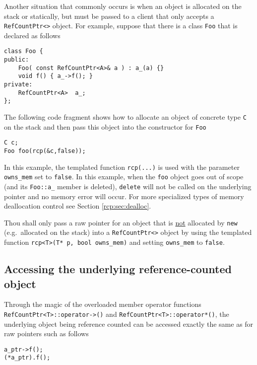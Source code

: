 Another situation that commonly occurs is when an object is allocated
on the stack or statically, but must be passed to a client that only
accepts a {}\texttt{RefCountPtr<>} object.  For example, suppose that
there is a class {}\texttt{Foo} that is declared as follows

{\scriptsize\begin{verbatim}
class Foo {
public:
    Foo( const RefCountPtr<A>& a ) : a_(a) {}
    void f() { a_->f(); }
private:
    RefCountPtr<A>  a_;
};
\end{verbatim}}

The following code fragment shows how to allocate an object of concrete
type {}\texttt{C} on the stack and then pass this object into the constructor
for {}\texttt{Foo}

{\scriptsize\begin{verbatim}
C c;
Foo foo(rcp(&c,false));
\end{verbatim}}

In this example, the templated function {}\texttt{rcp(...)} is used
with the parameter {}\texttt{owns\_mem} set to {}\texttt{false}.  In
this example, when the {}\texttt{foo} object goes out of scope (and
its {}\texttt{Foo::a\_} member is deleted), {}\texttt{delete} will not
be called on the underlying pointer and no memory error will occur.
For more specialized types of memory deallocation control see Section
{}\ref{rcp:sec:dealloc}.

\begin{commandment}
Thou shall only pass a raw pointer for an object that is
\underline{not} allocated by {}\texttt{new} (e.g.~allocated on the stack) into a
{}\texttt{RefCountPtr<>} object by using the templated function
{}\texttt{rcp<T>(T* p, bool owns\_mem)} and setting {}\texttt{owns\_mem} to
{}\texttt{false}.
\end{commandment}

%
\subsection{Accessing the underlying reference-counted object}
%

Through the magic of the overloaded member operator functions
{}\texttt{RefCountPtr<T>::operator->()} and
{}\texttt{RefCountPtr<T>::operator*()}, the underlying object being reference
counted can be accessed exactly the same as for raw pointers such as
follows

{\scriptsize\begin{verbatim}
a_ptr->f();
(*a_ptr).f();
\end{verbatim}}

